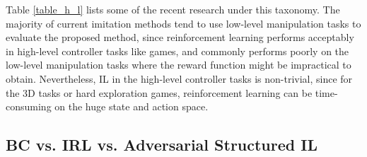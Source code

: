 \documentclass[acmsmall]{acmart}
\begin{document}
Table \ref{table_h_l} lists some of the recent research under this taxonomy. The majority of current imitation methods tend to use low-level manipulation tasks to evaluate the proposed method, since reinforcement learning performs acceptably in high-level controller tasks like games, and commonly performs poorly on the low-level manipulation tasks where the reward function might be impractical to obtain. Nevertheless, IL in the high-level controller tasks is non-trivial, since for the 3D tasks or hard exploration games, reinforcement learning can be time-consuming on the huge state and action space.

\subsection{BC vs. IRL vs. Adversarial Structured IL} 
\end{document}
